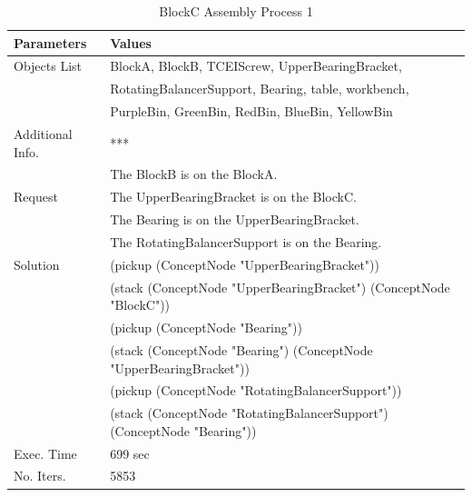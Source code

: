 \begin{table}[htbp]
  \centering
  \caption{BlockC Assembly Process 1}\label{tab:ass_C_1}
  \medskip
\begin{tabular}{ll}
\toprule
\textbf{Parameters} &  \textbf{Values}  \\
\midrule
\rowcolor{gray!25}
Objects List &  BlockA, BlockB, TCEIScrew, UpperBearingBracket, \\
\rowcolor{gray!25}
& RotatingBalancerSupport, Bearing, table, workbench, \\
\rowcolor{gray!25}
&  PurpleBin, GreenBin, RedBin, BlueBin, YellowBin \\
Additional Info. & *** \\
& The BlockB is on the BlockA. \\
\rowcolor{gray!25}
Request & The UpperBearingBracket is on the BlockC. \\
\rowcolor{gray!25}
& The Bearing is on the UpperBearingBracket. \\
\rowcolor{gray!25}
& The RotatingBalancerSupport is on the Bearing. \\
Solution & (pickup (ConceptNode "UpperBearingBracket")) \\
& (stack (ConceptNode "UpperBearingBracket") (ConceptNode "BlockC")) \\
& (pickup (ConceptNode "Bearing")) \\
& (stack (ConceptNode "Bearing") (ConceptNode "UpperBearingBracket")) \\
& (pickup (ConceptNode "RotatingBalancerSupport")) \\
& (stack (ConceptNode "RotatingBalancerSupport") (ConceptNode "Bearing")) \\
\rowcolor{gray!25}
Exec. Time & 699 sec \\
No. Iters. & 5853 \\	
\bottomrule
\end{tabular}
\end{table}

